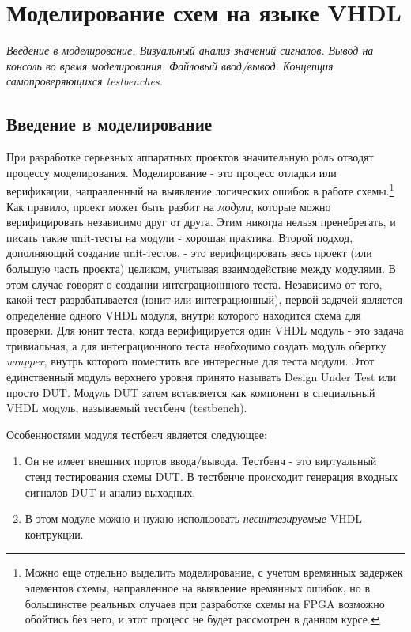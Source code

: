 \chapter{Моделирование схем на языке VHDL}

\emph{Введение в моделирование. Визуальный анализ значений сигналов. Вывод на консоль во время моделирования. Файловый ввод/вывод. Концепция самопроверяющихся testbenches.}

\section{Введение в моделирование}

При разработке серьезных аппаратных проектов значительную роль отводят процессу моделирования. Моделирование - это процесс отладки или верификации, направленный на выявление логических ошибок в работе схемы.\footnote{Можно еще отдельно выделить моделирование, с учетом времянных задержек элементов схемы, направленное на выявление времянных ошибок, но в большинстве реальных случаев при разработке схемы на FPGA возможно обойтись без него, и этот процесс не будет рассмотрен в данном курсе.} Как правило, проект может быть разбит на \emph{модули}, которые можно верифицировать независимо друг от друга. Этим никогда нельзя пренебрегать, и писать такие unit-тесты на модули - хорошая практика. Второй подход, дополняющий создание unit-тестов, - это верифицировать весь проект (или большую часть проекта) целиком, учитывая взаимодействие между модулями. В этом случае говорят о создании интеграционнного теста.
Независимо от того, какой тест разрабатывается (юнит или интеграционный), первой задачей является определение одного VHDL модуля, внутри которого находится схема для проверки. Для юнит теста, когда верифицируется один VHDL модуль - это задача тривиальная, а для интеграционного теста необходимо создать модуль обертку \emph{wrapper}, внутрь которого поместить все интересные для теста модули. Этот единственный модуль верхнего уровня принято называть Design Under Test или просто DUT. 
Модуль DUT затем вставляется как компонент в специальный VHDL модуль, называемый тестбенч (testbench). 

Особенностями модуля тестбенч является следующее:
\begin{enumerate}
\item Он не имеет внешних портов ввода/вывода. Тестбенч - это виртуальный стенд тестирования схемы DUT. В тестбенче происходит генерация входных сигналов DUT и анализ выходных.
\item В этом модуле можно и нужно использовать \emph{несинтезируемые} VHDL контрукции. 
\end{enumerate}

